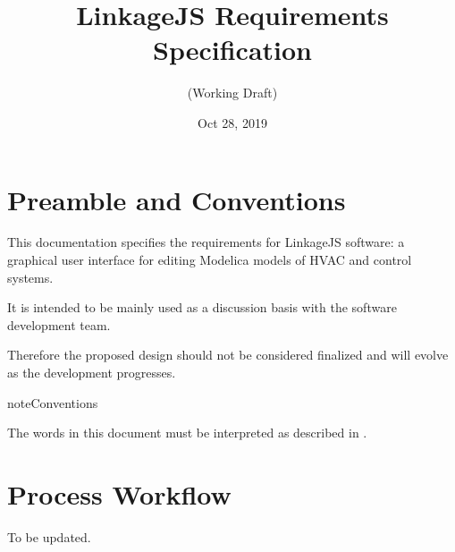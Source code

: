\documentclass[letterpaper,10pt, openany,english]{sphinxmanual}
\title{LinkageJS Requirements Specification}
\date{Oct 28, 2019}
\author{(Working Draft)}
\begin{document}
\pagestyle{empty}
\sphinxmaketitle
\pagestyle{plain}
\sphinxtableofcontents
\pagestyle{normal}
\label{\detokenize{index::doc}}




\pagestyle{plain}


\chapter{Preamble and Conventions}
\label{\detokenize{preamble:preamble-and-conventions}}\label{\detokenize{preamble::doc}}
This documentation specifies the requirements for LinkageJS software: a graphical user interface for editing Modelica models of HVAC and control systems.

It is intended to be mainly used as a discussion basis with the software development team.

Therefore the proposed design should not be considered finalized and will evolve as the development progresses.

\begin{sphinxadmonition}{note}{Conventions}

The words  in this document must be interpreted as described in .
\end{sphinxadmonition}


\chapter{Process Workflow}
\label{\detokenize{process:process-workflow}}\label{\detokenize{process:sec-process}}\label{\detokenize{process::doc}}
To be updated.
\end{document}

